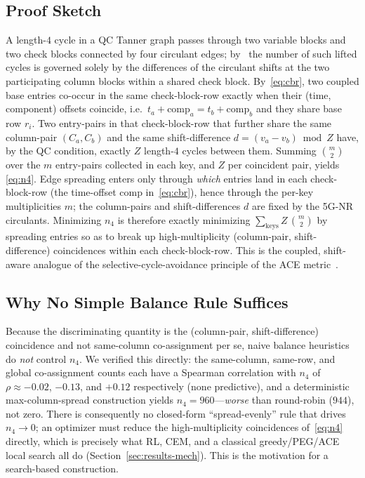 \documentclass[journal]{IEEEtran}
\begin{document}
\subsection{Proof Sketch}
A length-$4$ cycle in a QC Tanner graph passes through two variable blocks and
two check blocks connected by four circulant edges; by~\cite{fossorier2004qc} the
number of such lifted cycles is governed solely by the differences of the
circulant shifts at the two participating column blocks within a shared check
block. By~\eqref{eq:cbr}, two coupled base entries co-occur in the same
check-block-row exactly when their (time, component) offsets coincide, i.e.\
$t_a+\mathrm{comp}_a=t_b+\mathrm{comp}_b$ and they share base row $r_i$. Two
entry-pairs in that check-block-row that further share the same column-pair
$(C_a,C_b)$ and the same shift-difference $d=(v_a-v_b)\bmod Z$ have, by the QC
condition, exactly $Z$ length-$4$ cycles between them. Summing $\binom{m}{2}$ over
the $m$ entry-pairs collected in each key, and $Z$ per coincident pair, yields
\eqref{eq:n4}. Edge spreading enters only through \emph{which} entries land in
each check-block-row (the time-offset $\mathrm{comp}$ in~\eqref{eq:cbr}), hence
through the per-key multiplicities $m$; the column-pairs and shift-differences $d$
are fixed by the 5G-NR circulants. Minimizing $n_4$ is therefore exactly
minimizing $\sum_{\mathrm{keys}} Z\,\binom{m}{2}$ by spreading entries so as to
break up high-multiplicity (column-pair, shift-difference) coincidences within
each check-block-row. This is the coupled, shift-aware analogue of the
selective-cycle-avoidance principle of the ACE metric~\cite{tian2004ace}.

\subsection{Why No Simple Balance Rule Suffices}
Because the discriminating quantity is the (column-pair, shift-difference)
coincidence and not same-column co-assignment per se, naive balance heuristics do
\emph{not} control $n_4$. We verified this directly: the same-column, same-row,
and global co-assignment counts each have a Spearman correlation with $n_4$ of
$\rho\approx-0.02$, $-0.13$, and $+0.12$ respectively (none predictive), and a
deterministic max-column-spread construction yields $n_4=960$---\emph{worse} than
round-robin ($944$), not zero. There is consequently no closed-form
``spread-evenly'' rule that drives $n_4\to0$; an optimizer must reduce the
high-multiplicity coincidences of~\eqref{eq:n4} directly, which is precisely what
RL, CEM, and a classical greedy/PEG/ACE local search all do
(Section~\ref{sec:results-mech}). This is the motivation for a search-based
construction.
\end{document}
